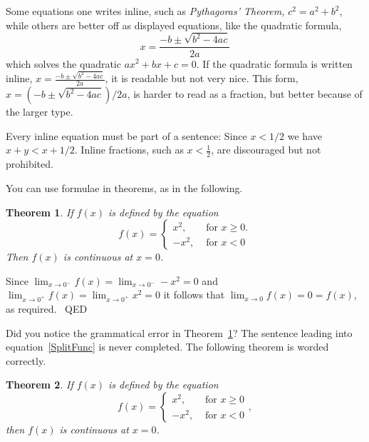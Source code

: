 \documentclass{article}
\newtheorem{theorem}{Theorem}
\newenvironment{proof}{{\sc Proof:}}{~\hfill QED}
\begin{document}
Some equations one writes inline, such as
{\em Pythagoras' Theorem,}
$c^{2} = a^{2} + b^{2}$,
while others are better off as displayed
equations, like the quadratic formula,
  $$x = \frac{-b \pm \sqrt{b^{2} - 4ac}}{2a}$$
which solves the quadratic $ax^{2} + bx + c = 0$. If the quadratic
formula is written inline,
  $x = \frac{-b \pm \sqrt{b^{2} - 4ac}}{2a}$,
it is readable but not very nice.
This form,
  $x = (-b \pm \sqrt{b^{2} - 4ac})/2a$,
is harder to read as a fraction, but better because of the larger type.

Every inline equation must be part of a sentence:  Since $x < 1/2$ we have
$x + y < x + 1/2$.  Inline fractions, such as $x < \frac{1}{2}$, are discouraged but
not prohibited.


You can use formulae in theorems, as in the following.

\begin{theorem}\label{ContThrm}
    If $f(x)$ is defined by the equation
    \begin{equation}\label{SplitFunc}
         f(x) = \left\{ \begin{array}{rl}
                          x^{2}, & \mbox{~for $x \geq 0$.} \\
                         -x^{2}, & \mbox{~for $x < 0$}
                         \end{array} \right.
   \end{equation}
   Then $f(x)$ is continuous at $x=0$.
\end{theorem}


\begin{proof}
    Since
          $\lim_{x \rightarrow 0^{-}} f(x) =
           \lim_{x \rightarrow 0^{-}} -x^{2} = 0$
    and
          $\lim_{x \rightarrow 0^{+}} f(x) =
           \lim_{x \rightarrow 0^{+}} x^{2} = 0$
    it follows that
         $\lim_{x \rightarrow 0} f(x) = 0 = f(x)$,
         as required.
\end{proof}





   Did you notice the grammatical error in
   Theorem~\ref{ContThrm}?  The sentence leading
   into equation~\ref{SplitFunc} is never completed.
   The following
   theorem is worded correctly.
\begin{theorem}
    If $f(x)$ is defined by the equation
    \begin{equation}
         f(x) = \left\{ \begin{array}{rl}
                          x^{2}, & \mbox{~for $x \geq 0$} \\
                         -x^{2}, & \mbox{~for $x < 0$}
                         \end{array}\right.,
   \end{equation}
   then $f(x)$ is continuous at $x=0$.
\end{theorem}
\end{document}
